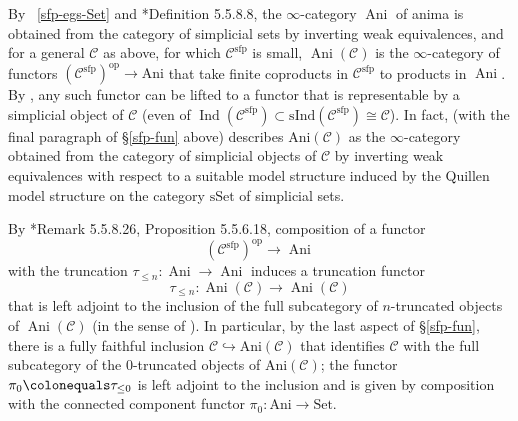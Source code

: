 \documentclass[11pt, reqno]{amsart}
\newcommand{\me}[1]{{\color{Plum} \sf \it{ {\scriptsize ``#1''} }}}
\newcommand{\sC}{\mathscr{C}}
\DeclareMathOperator{\Ani}{Ani}		%
\DeclareMathOperator{\Ind}{Ind}		%
\newcommand{\ce}{\colonequals}
\newcommand{\op}{{\mathrm{op}}}			%
\newcommand{\ra}{\rightarrow}
\newcommand{\sfp}{\mathrm{sfp}}		%
\providecommand{\qxq}[1]{\quad\text{#1}\quad}
\numberwithin{equation}{numberingbase}
\theoremstyle{thms}
\theoremstyle{claims}
\theoremstyle{defs}
\theoremstyle{thms}
\theoremstyle{defs}
\theoremstyle{subsection-tweak}
\theoremstyle{subsection-tweak}
\begin{document}
By ~\ref{sfp-egs-Set} and \cite{HTT}*{Definition 5.5.8.8}, the $\infty$-category $\Ani$ of anima is obtained from the category of simplicial sets by inverting weak equivalences, and for a general $\sC$ as above, for which $\sC^\sfp$ is small, $\Ani(\sC)$ is the $\infty$-category of functors $(\sC^{\sfp})^\mathrm{op}\to \mathrm{Ani}$ that take finite coproducts in $\sC^{\sfp}$ to products in $\Ani$. 
By \cite[Lemma 5.5.8.14]{HTT}, any such functor can be lifted to a %
functor that is representable by a simplicial object of $\sC$ (even of $\Ind(\sC^{\sfp}) \subset \mathrm{sInd}(\sC^\sfp) \cong \sC$).
In fact, \cite[Corollary 5.5.9.3]{HTT} (with the final paragraph of \S\ref{sfp-fun} above) describes $\mathrm{Ani}(\sC)$ as the $\infty$-category obtained from the category of simplicial objects of $\sC$ by inverting weak equivalences with respect to a suitable model structure induced by the Quillen model structure on the category $\mathrm{sSet}$ of simplicial sets. %

By \cite{HTT}*{Remark 5.5.8.26, Proposition 5.5.6.18}, composition of a functor
\[
(\sC^\sfp)^\op \ra \Ani
\]
with the truncation $\tau_{\le n} \colon \Ani \ra \Ani$ induces a truncation functor 
\[
\tau_{\le n} \colon \Ani(\sC) \ra \Ani(\sC)
\]
that is left adjoint to the inclusion of the full subcategory of $n$-truncated objects of $\Ani(\sC)$ (in the sense of \cite[Definition~5.5.6.1]{HTT}). In particular, by the last aspect of \S\ref{sfp-fun}, there is a fully faithful inclusion $\sC\hookrightarrow \mathrm{Ani}(\sC)$ that identifies $\sC$ with the full subcategory of the $0$-truncated objects of $\mathrm{Ani}(\sC)$; the functor $\pi_0 \ce \tau_{\le 0}$ is left adjoint to the inclusion and is given by composition with the  connected component functor $\pi_0\colon \mathrm{Ani}\to \mathrm{Set}$. %
\end{document}
